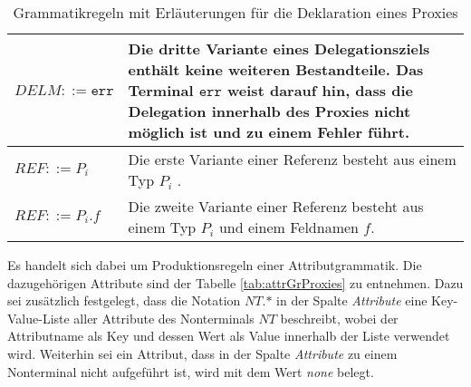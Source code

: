 \begin{table}[H]
\begin{tabular}{|p{5cm}|p{9cm}|}
\hline
$\mathit{DELM} ::= \texttt{err} $  
& Die dritte Variante eines Delegationsziels enthält keine weiteren Bestandteile. Das Terminal $\texttt{err}$ weist darauf hin, dass die Delegation innerhalb des Proxies nicht möglich ist und zu einem Fehler führt.\\
\hline
$\mathit{REF} ::= \mathit{P_i}$
& Die erste Variante einer Referenz besteht aus einem Typ $P_i$ .\\
\hline
$\mathit{REF} ::= \mathit{P_i}\texttt{.}\mathit{f}$
& Die zweite Variante einer Referenz besteht aus einem Typ $P_i$ und einem Feldnamen $f$.\\
\hline
\end{tabular}
\caption{Grammatikregeln mit Erläuterungen für die Deklaration eines Proxies}
 \label{tab:grProxies}
\end{table}
\noindent
Es handelt sich dabei um Produktionsregeln einer Attributgrammatik. Die dazugehörigen Attribute sind der Tabelle \ref{tab:attrGrProxies} zu entnehmen. Dazu sei zusätzlich festgelegt, dass die Notation $\mathit{NT}\texttt{.}\text{*}$ in der Spalte \emph{Attribute} eine Key-Value-Liste aller Attribute des Nonterminals $\mathit{NT}$ beschreibt, wobei der Attributname als Key und dessen Wert als Value innerhalb der Liste verwendet wird. Weiterhin sei ein Attribut, dass in der Spalte \emph{Attribute} zu einem Nonterminal nicht aufgeführt ist, wird mit dem Wert \emph{none} belegt.
